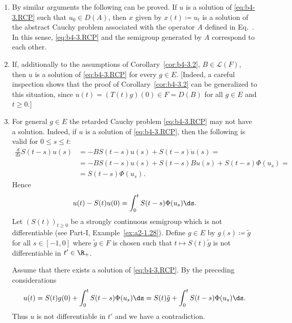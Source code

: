 \begin{remarks*} 
\begin{enumerate}[\upshape (i), wide, labelindent=.25em]

\item 
By similar arguments the following can be proved. 
If\/ $u$ is a solution of \eqref{eq:b4-3.RCP} such that $u_{0} \in D(A)$, then $x$ given by $x(t) \coloneq  u_t$ is a solution of the abstract Cauchy problem associated with the operator $A$ defined in Eq.~. 
In this sense, \eqref{eq:b4-3.RCP} and the semigroup generated by $A$ correspond to each other.

\item 
If, additionally to the assumptions of Corollary~\ref{cor:b4-3.2}, $B \in \mathcal{L}(F)$, then $u$ is a solution of \eqref{eq:b4-3.RCP} for every $g \in E$. 
[Indeed, a careful inspection shows that the proof of Corollary~\ref{cor:b4-3.2} can be generalized to this situation, since $u(t) = (T(t)g)(0) \in F = D(B)$ for all $g \in E$ and $t \geq 0$.]

\item 
For general $g \in E$ the retarded Cauchy problem \eqref{eq:b4-3.RCP} may not have a solution. 
Indeed, if\/ $u$ is a solution of \eqref{eq:b4-3.RCP}, then the following is valid for $0 \leq s \leq t$:
\begin{equation*}
	\begin{aligned}
\frac{d}{ds}S(t-s)u(s) &= -BS(t-s)u(s) + S(t-s)\dot{u}(s) =\\
& = -BS(t-s)u(s) + S(t-s)Bu(s) + S(t-s)\Phi(u_s) = \\ & =S(t-s)\Phi(u_s) .
\end{aligned}
\end{equation*} 
Hence
\[
u(t) - S(t)u(0) = \int_0^t S(t-s)\Phi(u_s)  \ds .
\]
Let $(S(t))_{t \geq 0}$ be a strongly continuous semigroup which is not differentiable (see  Part-I, Example~\ref{ex:a2-1.28}). 
Define $g \in E$ by $g(s)  \coloneq  \tilde{g}$ for all $s \in [-1,0]$ where $\tilde{g} \in F$ is chosen such that
$t \mapsto S(t)\tilde{g}$ is not differentiable in $t' \in \R_+$.

Assume that there exists a solution of \eqref{eq:b4-3.RCP}. 
By the preceding considerations
\[
u(t) = S(t)g(0) + \int_0^t S(t-s)\Phi(u_s)  \ds  = S(t)\tilde{g} + \int_0^t S(t-s)\Phi(u_s)  \ds  .
\]
Thus $u$ is not differentiable in $t'$ and we have a contradiction.
\end{enumerate}
\end{remarks*}
